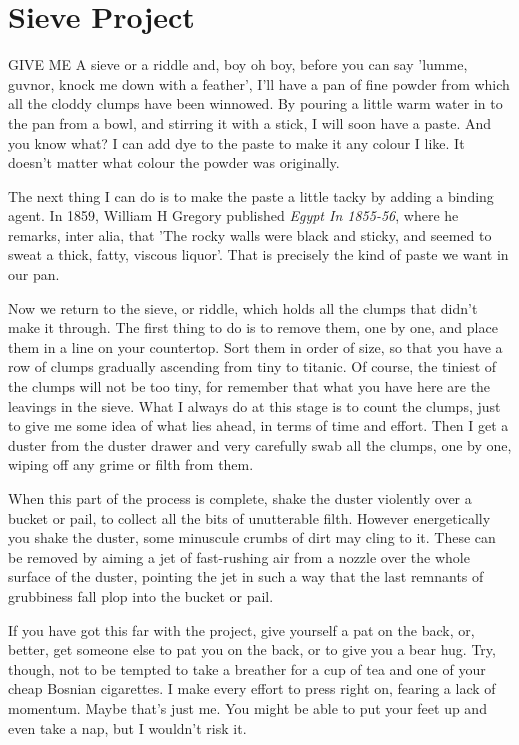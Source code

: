 \chapter{Sieve Project}

GIVE ME A sieve or a riddle and, boy oh boy, before you can say 'lumme, guvnor, knock me down with a feather', I'll have a pan of fine powder from which all the cloddy clumps have been winnowed. By pouring a little warm water in to the pan from a bowl, and stirring it with a stick, I will soon have a paste. And you know what? I can add dye to the paste to make it any colour I like. It doesn't matter what colour the powder was originally.

The next thing I can do is to make the paste a little tacky by adding a binding agent. In 1859, William H Gregory published \emph{Egypt In 1855-56}, where he remarks, inter alia, that 'The rocky walls were black and sticky, and seemed to sweat a thick, fatty, viscous liquor'. That is precisely the kind of paste we want in our pan.

Now we return to the sieve, or riddle, which holds all the clumps that didn't make it through. The first thing to do is to remove them, one by one, and place them in a line on your countertop. Sort them in order of size, so that you have a row of clumps gradually ascending from tiny to titanic. Of course, the tiniest of the clumps will not be too tiny, for remember that what you have here are the leavings in the sieve. What I always do at this stage is to count the clumps, just to give me some idea of what lies ahead, in terms of time and effort. Then I get a duster from the duster drawer and very carefully swab all the clumps, one by one, wiping off any grime or filth from them.

When this part of the process is complete, shake the duster violently over a bucket or pail, to collect all the bits of unutterable filth. However energetically you shake the duster, some minuscule crumbs of dirt may cling to it. These can be removed by aiming a jet of fast-rushing air from a nozzle over the whole surface of the duster, pointing the jet in such a way that the last remnants of grubbiness fall plop into the bucket or pail.

If you have got this far with the project, give yourself a pat on the back, or, better, get someone else to pat you on the back, or to give you a bear hug. Try, though, not to be tempted to take a breather for a cup of tea and one of your cheap Bosnian cigarettes. I make every effort to press right on, fearing a lack of momentum. Maybe that's just me. You might be able to put your feet up and even take a nap, but I wouldn't risk it.


